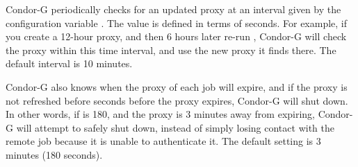 Condor-G periodically checks for an updated proxy at
an interval given by the configuration variable
.
The value is defined in terms of seconds.
For example, if you create a 12-hour proxy, and then
6 hours later re-run ,
Condor-G will check the proxy within
this time interval, and use the new proxy it finds there.
The default interval is 10 minutes.

Condor-G also knows when the proxy of each job will expire,
and if the proxy is not refreshed before
seconds before the proxy expires,
Condor-G will shut down.
In other words, if
is 180, and the proxy is 3 minutes away from
expiring, Condor-G will attempt to safely shut down,
instead of simply losing
contact with the remote job because it is unable to authenticate it.
The default setting is 3 minutes (180 seconds).

